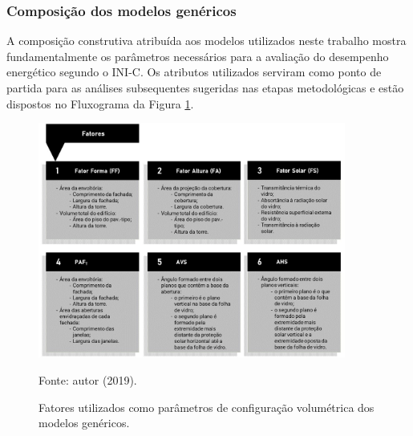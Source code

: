 \subsubsection{Composição dos modelos genéricos}
A composição construtiva atribuída aos modelos utilizados neste trabalho mostra fundamentalmente 
os parâmetros necessários para a avaliação do desempenho energético segundo o INI-C. Os 
atributos utilizados serviram como ponto de partida para as análises subsequentes sugeridas nas 
etapas metodológicas e estão dispostos no Fluxograma da Figura \ref{fig:figura10}.
    \begin{figure}[ht]
        \centering
        \caption{\small Fatores utilizados como parâmetros de configuração volumétrica dos modelos genéricos.}
        \includegraphics[width=0.9\textwidth]{figures/fig10_Fluxogramas-2.jpg}
        \begin{flushleft}
            \par \small Fonte: autor (2019).
        \end{flushleft}
        \label{fig:figura10}
    \end{figure}
    
